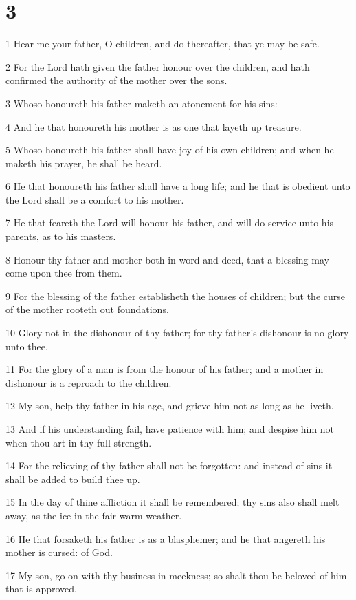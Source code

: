 \chapter{3}

\par 1 Hear me your father, O children, and do thereafter, that ye may be safe.
\par 2 For the Lord hath given the father honour over the children, and hath confirmed the authority of the mother over the sons.
\par 3 Whoso honoureth his father maketh an atonement for his sins:
\par 4 And he that honoureth his mother is as one that layeth up treasure.
\par 5 Whoso honoureth his father shall have joy of his own children; and when he maketh his prayer, he shall be heard.
\par 6 He that honoureth his father shall have a long life; and he that is obedient unto the Lord shall be a comfort to his mother.
\par 7 He that feareth the Lord will honour his father, and will do service unto his parents, as to his masters.
\par 8 Honour thy father and mother both in word and deed, that a blessing may come upon thee from them.
\par 9 For the blessing of the father establisheth the houses of children; but the curse of the mother rooteth out foundations.
\par 10 Glory not in the dishonour of thy father; for thy father's dishonour is no glory unto thee.
\par 11 For the glory of a man is from the honour of his father; and a mother in dishonour is a reproach to the children.
\par 12 My son, help thy father in his age, and grieve him not as long as he liveth.
\par 13 And if his understanding fail, have patience with him; and despise him not when thou art in thy full strength.
\par 14 For the relieving of thy father shall not be forgotten: and instead of sins it shall be added to build thee up.
\par 15 In the day of thine affliction it shall be remembered; thy sins also shall melt away, as the ice in the fair warm weather.
\par 16 He that forsaketh his father is as a blasphemer; and he that angereth his mother is cursed: of God.
\par 17 My son, go on with thy business in meekness; so shalt thou be beloved of him that is approved.
